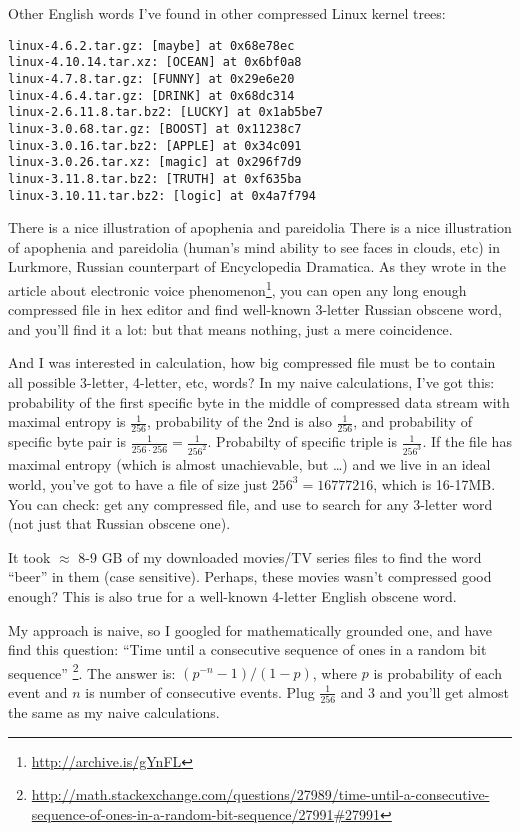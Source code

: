 Other English words I've found in other compressed Linux kernel trees:

\begin{lstlisting}
linux-4.6.2.tar.gz: [maybe] at 0x68e78ec
linux-4.10.14.tar.xz: [OCEAN] at 0x6bf0a8
linux-4.7.8.tar.gz: [FUNNY] at 0x29e6e20
linux-4.6.4.tar.gz: [DRINK] at 0x68dc314
linux-2.6.11.8.tar.bz2: [LUCKY] at 0x1ab5be7
linux-3.0.68.tar.gz: [BOOST] at 0x11238c7
linux-3.0.16.tar.bz2: [APPLE] at 0x34c091
linux-3.0.26.tar.xz: [magic] at 0x296f7d9
linux-3.11.8.tar.bz2: [TRUTH] at 0xf635ba
linux-3.10.11.tar.bz2: [logic] at 0x4a7f794
\end{lstlisting}

There is a nice illustration of apophenia and pareidolia
There is a nice illustration of apophenia and pareidolia
(human's mind ability to see faces in clouds, etc) in Lurkmore, Russian counterpart of Encyclopedia Dramatica.
As they wrote in the article about electronic voice phenomenon\footnote{\url{http://archive.is/gYnFL}},
you can open any long enough compressed file in hex editor and find well-known 3-letter Russian obscene word, and you'll find it a lot: but that means nothing, just a mere coincidence.

And I was interested in calculation, how big compressed file must be to contain all possible 3-letter, 4-letter, etc, words?
In my naive calculations, I've got this: probability of the first specific byte in the middle of compressed data stream with maximal entropy is $\frac{1}{256}$, probability of the 2nd is also $\frac{1}{256}$,
and probability of specific byte pair is $\frac{1}{256 \cdot 256} = \frac{1}{256^2}$.
Probabilty of specific triple is $\frac{1}{256^3}$.
If the file has maximal entropy (which is almost unachievable, but \dots) and we live in an ideal world, you've got to have a file of size just $256^3=16777216$, which is 16-17MB.
You can check: get any compressed file, and use  to search for any 3-letter word (not just that Russian obscene one).

It took $\approx$ 8-9 GB of my downloaded movies/TV series files to find the word ``beer'' in them (case sensitive).
Perhaps, these movies wasn't compressed good enough?
This is also true for a well-known 4-letter English obscene word.

My approach is naive, so I googled for mathematically grounded one, and have find this question:
``Time until a consecutive sequence of ones in a random bit sequence''
\footnote{\url{http://math.stackexchange.com/questions/27989/time-until-a-consecutive-sequence-of-ones-in-a-random-bit-sequence/27991#27991}}.
The answer is: $(p^{−n}−1)/(1−p)$, where $p$ is probability of each event and $n$ is number of consecutive events.
Plug $\frac{1}{256}$ and $3$ and you'll get almost the same as my naive calculations.

